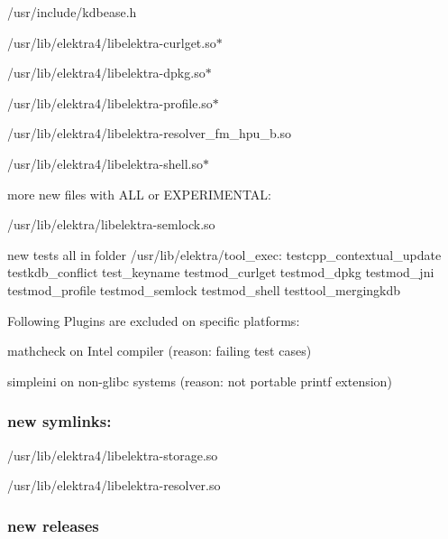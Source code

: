 \begin{DoxyItemize}
\item /usr/include/kdbease.h
\item /usr/lib/elektra4/libelektra-\/curlget.so$\ast$
\item /usr/lib/elektra4/libelektra-\/dpkg.so$\ast$
\item /usr/lib/elektra4/libelektra-\/profile.so$\ast$
\item /usr/lib/elektra4/libelektra-\/resolver\+\_\+fm\+\_\+hpu\+\_\+b.so
\item /usr/lib/elektra4/libelektra-\/shell.so$\ast$
\end{DoxyItemize}

more new files with A\+LL or E\+X\+P\+E\+R\+I\+M\+E\+N\+T\+AL\+:


\begin{DoxyItemize}
\item /usr/lib/elektra/libelektra-\/semlock.so
\end{DoxyItemize}

new tests all in folder /usr/lib/elektra/tool\+\_\+exec\+: testcpp\+\_\+contextual\+\_\+update testkdb\+\_\+conflict test\+\_\+keyname testmod\+\_\+curlget testmod\+\_\+dpkg testmod\+\_\+jni testmod\+\_\+profile testmod\+\_\+semlock testmod\+\_\+shell testtool\+\_\+mergingkdb

Following Plugins are excluded on specific platforms\+:


\begin{DoxyItemize}
\item mathcheck on Intel compiler (reason\+: failing test cases)
\item simpleini on non-\/glibc systems (reason\+: not portable printf extension)
\end{DoxyItemize}

\subsubsection*{new symlinks\+:}


\begin{DoxyItemize}
\item /usr/lib/elektra4/libelektra-\/storage.so
\item /usr/lib/elektra4/libelektra-\/resolver.so
\end{DoxyItemize}

\subsubsection*{new releases}

